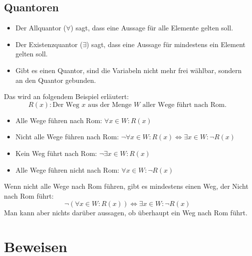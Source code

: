 \subsection{Quantoren}
  \begin{itemize}
    \item Der Allquantor ($\forall$) sagt, dass eine Aussage für alle
      Elemente gelten soll.
    \item Der Existenzquantor ($\exists$) sagt, dass eine Aussage für
      mindestens ein Element gelten soll.
    \item Gibt es einen Quantor, sind die Variabeln nicht mehr frei wählbar,
      sondern an den Quantor gebunden.
  \end{itemize}
  Das wird an folgendem Beispiel erläutert:
  \[R(x) : \text{Der Weg } x \text{ aus der Menge } W \text{ aller Wege führt nach Rom.} \]
  \begin{itemize}
    \item Alle Wege führen nach Rom: $\forall x \in W: R(x)$
    \item Nicht alle Wege führen nach Rom: $\neg \forall x \in W: R(x)
    \Leftrightarrow \exists x \in W: \neg R(x)$
    \item Kein Weg führt nach Rom: $\neg \exists x \in W: R(x)$
    \item Alle Wege führen nicht nach Rom: $\forall x \in W: \neg R(x)$
  \end{itemize}
  Wenn nicht alle Wege nach Rom führen, gibt es mindestens einen Weg,
    der Nicht nach Rom führt:
  \[ \neg (\forall x \in W: R(x)) \Leftrightarrow \exists x \in W: \neg R(x) \]
  Man kann aber nichts darüber aussagen, ob überhaupt ein Weg nach Rom führt.

\begin{comment} %
\subsection{Natürliche Zahlen}
  Null ist eine natürliche Zahl und jede natürliche Zahl hat einen
    Nachfolger (ausser der Null).
  Wir können die Nachfolger von $n$ mit $s(n)$ darstellen:
  \[ 0, s(0), s(s(0)), s(s(s(0))), \dots \]
  Das kann später noch nützlich sein.
\end{comment}

\section{Beweisen}
